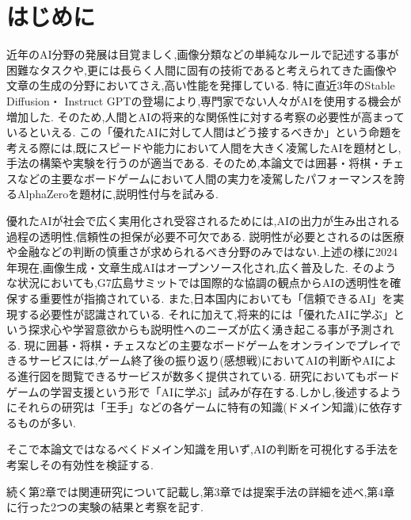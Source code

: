 \chapter{はじめに}
近年のAI分野の発展は目覚ましく,画像分類などの単純なルールで記述する事が困難なタスクや,更には長らく人間に固有の技術であると考えられてきた画像や文章の生成の分野においてさえ,高い性能を発揮している\cite{cat}.
特に直近3年のStable Diffusion\cite{diffusion}・ Instruct GPT\cite{GPT}の登場により,専門家でない人々がAIを使用する機会が増加した.
そのため,人間とAIの将来的な関係性に対する考察の必要性が高まっているといえる.
この「優れたAIに対して人間はどう接するべきか」という命題を考える際には,既にスピードや能力において人間を大きく凌駕したAIを題材とし,手法の構築や実験を行うのが適当である.
そのため,本論文では囲碁・将棋・チェスなどの主要なボードゲームにおいて人間の実力を凌駕したパフォーマンスを誇るAlphaZero\cite{AlphaZero}を題材に,説明性付与を試みる.

優れたAIが社会で広く実用化され受容されるためには,AIの出力が生み出される過程の透明性,信頼性の担保が必要不可欠である.
説明性が必要とされるのは医療や金融などの判断の慎重さが求められるべき分野のみではない.上述の様に2024年現在,画像生成・文章生成AIはオープンソース化され,広く普及した.
そのような状況においても,G7広島サミットでは国際的な協調の観点からAIの透明性を確保する重要性が指摘されている\cite{Hiroshima}.
また,日本国内においても「信頼できるAI」を実現する必要性が認識されている\cite{グランドデザイン}.
それに加えて,将来的には「優れたAIに学ぶ」という探求心や学習意欲からも説明性へのニーズが広く湧き起こる事が予測される.
現に囲碁・将棋・チェスなどの主要なボードゲームをオンラインでプレイできるサービスには,ゲーム終了後の振り返り(感想戦)においてAIの判断やAIによる進行図を閲覧できるサービスが数多く提供されている\cite{panda}\cite{wars}.
研究においてもボードゲームの学習支援という形で「AIに学ぶ」試みが存在する.しかし,後述するようにそれらの研究は「王手」などの各ゲームに特有の知識(ドメイン知識)に依存するものが多い.

そこで本論文ではなるべくドメイン知識を用いず,AIの判断を可視化する手法を考案しその有効性を検証する.

続く第2章では関連研究について記載し,第3章では提案手法の詳細を述べ,第4章に行った2つの実験の結果と考察を記す.

